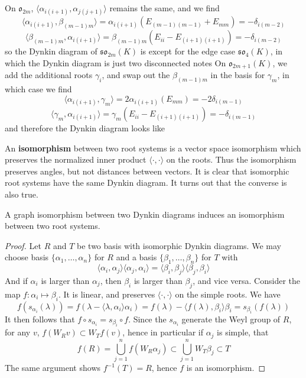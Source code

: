 \begin{example}
    On $\mathfrak{o}_{2m}$, $\langle \alpha_{i(i+1)}, \alpha_{j(j+1)} \rangle$ remains the same, and we find
    \[ \langle \alpha_{i(i+1)}, \beta_{(m-1)m} \rangle = \alpha_{i(i+1)}(E_{(m-1)(m-1)} + E_{mm}) = -\delta_{i(m-2)} \]
    \[ \langle \beta_{(m-1)m}, \alpha_{i(i+1)} \rangle = \beta_{(m-1)m}(E_{ii} - E_{(i+1)(i+1)}) = -\delta_{i(m-2)} \]
    so the Dynkin diagram of $\mathfrak{so}_{2m}(K)$ is
    except for the edge case $\mathfrak{so}_4(K)$, in which the Dynkin diagram is just two disconnected notes
    On $\mathfrak{o}_{2m+1}(K)$, we add the additional roots $\gamma_i$, and swap out the $\beta_{(m-1)m}$ in the basis for $\gamma_m$, in which case we find
    \[ \langle \alpha_{i(i+1)}, \gamma_m \rangle = 2 \alpha_{i(i+1)}(E_{mm}) = -2 \delta_{i(m-1)} \]
    \[ \langle \gamma_m, \alpha_{i(i+1)} \rangle = \gamma_m(E_{ii} - E_{(i+1)(i+1)}) = -\delta_{i(m-1)} \]
    and therefore the Dynkin diagram looks like
\end{example}

An {\bf isomorphism} between two root systems is a vector space isomorphism which preserves the normalized inner product $\langle \cdot, \cdot \rangle$ on the roots. Thus the isomorphism preserves angles, but not distances between vectors. It is clear that isomorphic root systems have the same Dynkin diagram. It turns out that the converse is also true.

\begin{theorem}
    A graph isomorphism between two Dynkin diagrams induces an isomorphism between two root systems.
\end{theorem}
\begin{proof}
    Let $R$ and $T$ be two basis with isomorphic Dynkin diagrams. We may choose basis $\{ \alpha_1, \dots, \alpha_n \}$ for $R$ and a basis $\{ \beta_1, \dots, \beta_n \}$ for $T$ with
    \[ \langle \alpha_i, \alpha_j \rangle \langle \alpha_j, \alpha_i \rangle = \langle \beta_i, \beta_j \rangle \langle \beta_j, \beta_i \rangle \]
    And if $\alpha_i$ is larger than $\alpha_j$, then $\beta_i$ is larger than $\beta_j$, and vice versa. Consider the map $f: \alpha_i \mapsto \beta_i$. It is linear, and preserves $\langle \cdot, \cdot \rangle$ on the simple roots. We have
    \[ f(s_{\alpha_i}(\lambda)) = f(\lambda - \langle \lambda, \alpha_i \rangle \alpha_i) = f(\lambda) - \langle f(\lambda), \beta_i \rangle \beta_i = s_{\beta_i}(f(\lambda)) \]
    It then follows that $f \circ s_{\alpha_i} = s_{\beta_i} \circ f$. Since the $s_{\alpha_i}$ generate the Weyl group of $R$, for any $v$, $f(W_Rv) \subset W_T f(v)$, hence in particular if $\alpha_j$ is simple, that
    \[ f(R) = \bigcup_{j = 1}^n f(W_R \alpha_j) \subset \bigcup_{j = 1}^n W_T \beta_j \subset T \]
    The same argument shows $f^{-1}(T) = R$, hence $f$ is an isomorphism.
\end{proof}

